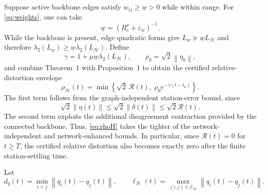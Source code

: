 \documentclass[11pt,a4paper]{article}
\theoremstyle{remark}
\newcommand{\norm}[1]{\left\lVert#1\right\rVert}
\newcommand{\epsreg}{\varepsilon_w}
\newcommand{\env}{\mathcal R}
\begin{document}
Suppose active backbone edges satisfy $w_{ij}\ge\underline w>0$ while within range. For \eqref{eq:weights}, one can take
\begin{equation}
\underline w=(R_c^\nu+\epsreg)^{-1}.
\label{eq:wlower}
\end{equation}
While the backbone is present, edge quadratic forms give
$L_w\succeq\underline wL_{\mathcal H}$ and therefore
$\lambda_2(L_w)\ge\underline w\lambda_2(L_{\mathcal H})$.
Define
\begin{equation}
\gamma=1+\mu\underline w\lambda_2(L_{\mathcal H}),\qquad
\rho_0=\sqrt2\norm{\eta_0},
\label{eq:gamma}
\end{equation}
and combine Theorem~1 with Proposition~1 to obtain the certified relative-distortion envelope
\begin{equation}
\boxed{
\rho_{\mathcal H}(t)
=
\min\!\left\{
\sqrt{2}\,\env(t),
\;
\rho_0 e^{-\gamma(t-t_0)}
\right\}.
}
\label{eq:rhoH}
\end{equation}
The first term follows from the graph-independent station-error
bound, since
\[
\sqrt{2}\norm{\eta(t)}
\le
\sqrt{2}\norm{\delta(t)}
\le
\sqrt{2}\env(t).
\]
The second term exploits the additional disagreement contraction
provided by the connected backbone. Thus, \eqref{eq:rhoH} takes
the tighter of the network-independent and network-enhanced
bounds. In particular, since $\env(t)=0$ for
$t\ge\overline T$, the certified relative distortion also becomes
exactly zero after the finite station-settling time.

Let
\begin{equation}
d_q(t)=\min_{i<j}\norm{q_i(t)-q_j(t)},\qquad
\ell_{\mathcal H}(t)=\max_{(i,j)\in\mathcal E_{\mathcal H}}
\norm{q_i(t)-q_j(t)}.
\label{eq:geometry}
\end{equation}
\end{document}

